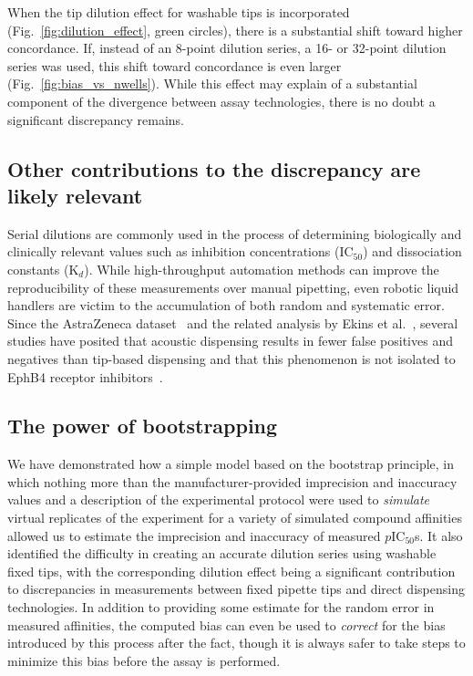 \documentclass[aps,pre,twocolumn,nofootinbib,superscriptaddress,linenumbers]{revtex4-1}
\begin{document}
When the tip dilution effect for washable tips is incorporated (Fig.~\ref{fig:dilution_effect}, green circles), there is a substantial shift toward higher concordance.
If, instead of an 8-point dilution series, a 16- or 32-point dilution series was used, this shift toward concordance is even larger (Fig.~\ref{fig:bias_vs_nwells}).
While this effect may explain of a substantial component of the divergence between assay technologies, there is no doubt a significant discrepancy remains.

\subsection*{Other contributions to the discrepancy are likely relevant}

Serial dilutions are commonly used in the process of determining biologically and clinically relevant values such as inhibition concentrations (IC$_{ 50}$)  and dissociation constants (K$_{d}$). 
While high-throughput automation methods can improve the reproducibility of these measurements over manual pipetting, even robotic liquid handlers are victim to the accumulation of both random and systematic error.
Since the AstraZeneca dataset~\cite{barlaam_novel_2009,barlaam_pyrimidine_2010} and the related analysis by Ekins et al.~\cite{ekins_dispensing_2013}, several studies have posited that acoustic dispensing results in fewer false positives and negatives than tip-based dispensing and that this phenomenon is not isolated to EphB4 receptor inhibitors~\cite{wingfield_impact_2012,olechno_direct_2013,olechno_sound_2013,olechno_improving_2006}. 

\subsection*{The power of bootstrapping}

We have demonstrated how a simple model based on the bootstrap principle, in which nothing more than the manufacturer-provided imprecision and inaccuracy values and a description of the experimental protocol were used to \emph{simulate} virtual replicates of the experiment for a variety of simulated compound affinities allowed us to estimate the imprecision and inaccuracy of measured $p$IC$_{50}$s.
It also identified the difficulty in creating an accurate dilution series using washable fixed tips, with the corresponding dilution effect being a significant contribution to discrepancies in measurements between fixed pipette tips and direct dispensing technologies. 
In addition to providing some estimate for the random error in measured affinities, the computed bias can even be used to \emph{correct} for the bias introduced by this process after the fact, though it is always safer to take steps to minimize this bias before the assay is performed. 
\end{document}
